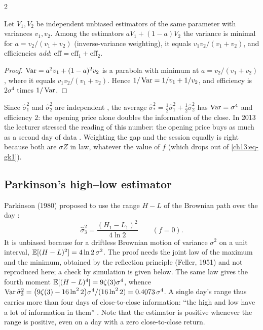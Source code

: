 \begin{paracol}{2}
\begin{lemma}\label{ch13:lem-comb}
Let $V_1,V_2$ be independent unbiased estimators of the same parameter with variances $v_1,v_2$. Among the estimators
$aV_1+(1-a)V_2$ the variance is minimal for $a=v_2/(v_1+v_2)$ (inverse-variance weighting), it equals $v_1v_2/(v_1+v_2)$, and
efficiencies \emph{add}: $\mathrm{eff}=\mathrm{eff}_1+\mathrm{eff}_2$.
\end{lemma}
\begin{proof}
$\operatorname{Var}=a^2v_1+(1-a)^2v_2$ is a parabola with minimum at $a=v_2/(v_1+v_2)$, where it equals $v_1v_2/(v_1+v_2)$. Hence $1/\operatorname{Var}=1/v_1+1/v_2$,
and efficiency is $2\sigma^4$ times $1/\operatorname{Var}$.
\end{proof}
Since $\hat\sigma^2_1$ and $\hat\sigma^2_2$ are independent , the average
$\hat\sigma^2_*=\tfrac12\hat\sigma^2_1+\tfrac12\hat\sigma^2_2$ has $\operatorname{Var}=\sigma^4$ and efficiency $2$: the opening price alone
doubles the information of the close. In 2013 the lecturer stressed the reading of this number: the opening price buys as much as a
second day of data . Weighting the gap and the session equally is right because both are
$\sigma Z$ in law, whatever the value of $f$ (which drops out of \eqref{ch13:eq-gk1}).

\subsection{Parkinson's high--low estimator}\label{ch13:sec-parkinson}
Parkinson (1980) proposed to use the range $H-L$ of the Brownian path over the day :
\begin{equation}\label{ch13:eq-parkinson}
  \hat\sigma_3^2=\frac{(H_1-L_1)^2}{4\ln2}\qquad(f=0).
\end{equation}
It is unbiased because for a driftless Brownian motion of variance $\sigma^2$ on a unit interval, $\mathbb{E}[(H-L)^2]=4\ln2\,\sigma^2$.
The proof needs the joint law of the maximum and the minimum, obtained by the reflection principle (Feller, 1951) and not
reproduced here; a check by simulation is given below. The same law gives the fourth moment $\mathbb{E}[(H-L)^4]=9\zeta(3)\sigma^4$, whence
$\operatorname{Var}\hat\sigma_3^2=\bigl(9\zeta(3)-16\ln^22\bigr)\sigma^4/(16\ln^22)=0.4073\,\sigma^4$.
A single day's range thus carries more than four days of close-to-close information: ``the high and low have a lot
of information in them'' . Note that the estimator is positive whenever the range is positive, even on a day with a zero
close-to-close return.


\end{paracol}
